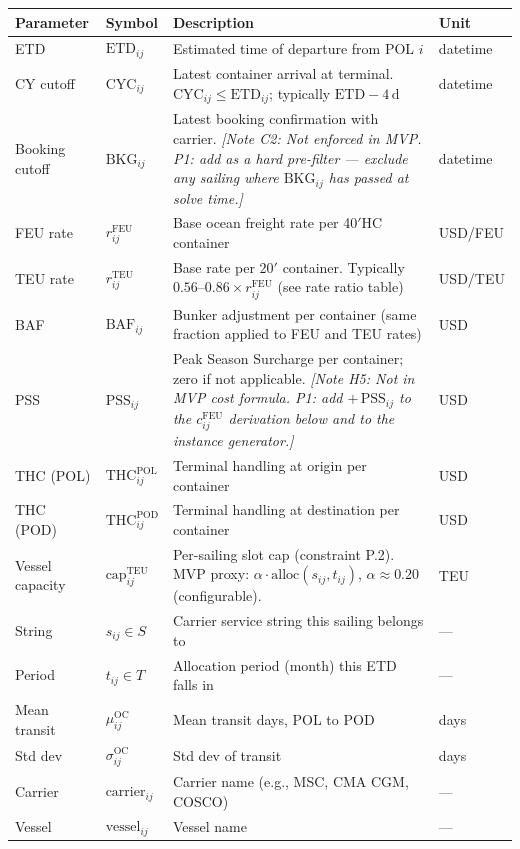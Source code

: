 \documentclass[11pt,a4paper]{article}
\theoremstyle{definition}
\begin{document}
\begin{center}
\begin{tabular}{llp{5.5cm}l}
\toprule
Parameter & Symbol & Description & Unit \\
\midrule
ETD & $\text{ETD}_{ij}$ & Estimated time of departure from POL $i$ & datetime \\
CY cutoff & $\text{CYC}_{ij}$ & Latest container arrival at terminal. $\text{CYC}_{ij} \leq \text{ETD}_{ij}$; typically $\text{ETD} - 4\,\text{d}$ & datetime \\
Booking cutoff & $\text{BKG}_{ij}$ & Latest booking confirmation with carrier. \textit{[Note C2: Not enforced in MVP. P1: add as a hard pre-filter --- exclude any sailing where $\text{BKG}_{ij}$ has passed at solve time.]} & datetime \\
FEU rate & $r_{ij}^{\text{FEU}}$ & Base ocean freight rate per 40$'$HC container & USD/FEU \\
TEU rate & $r_{ij}^{\text{TEU}}$ & Base rate per 20$'$ container. Typically $0.56$--$0.86 \times r_{ij}^{\text{FEU}}$ (see rate ratio table) & USD/TEU \\
BAF & $\text{BAF}_{ij}$ & Bunker adjustment per container (same fraction applied to FEU and TEU rates) & USD \\
PSS & $\text{PSS}_{ij}$ & Peak Season Surcharge per container; zero if not applicable. \textit{[Note H5: Not in MVP cost formula. P1: add $+\,\text{PSS}_{ij}$ to the $c_{ij}^{\text{FEU}}$ derivation below and to the instance generator.]} & USD \\
THC (POL) & $\text{THC}_{ij}^{\text{POL}}$ & Terminal handling at origin per container & USD \\
THC (POD) & $\text{THC}_{ij}^{\text{POD}}$ & Terminal handling at destination per container & USD \\
Vessel capacity & $\text{cap}_{ij}^{\text{TEU}}$ & Per-sailing slot cap (constraint P.2). MVP proxy: $\alpha \cdot \text{alloc}(s_{ij}, t_{ij})$, $\alpha \approx 0.20$ (configurable). & TEU \\
String & $s_{ij} \in S$ & Carrier service string this sailing belongs to & — \\
Period & $t_{ij} \in T$ & Allocation period (month) this ETD falls in & — \\
Mean transit & $\mu_{ij}^{\text{OC}}$ & Mean transit days, POL to POD & days \\
Std dev & $\sigma_{ij}^{\text{OC}}$ & Std dev of transit & days \\
Carrier & $\text{carrier}_{ij}$ & Carrier name (e.g., MSC, CMA CGM, COSCO) & — \\
Vessel & $\text{vessel}_{ij}$ & Vessel name & — \\
\bottomrule
\end{tabular}
\end{center}
\end{document}
